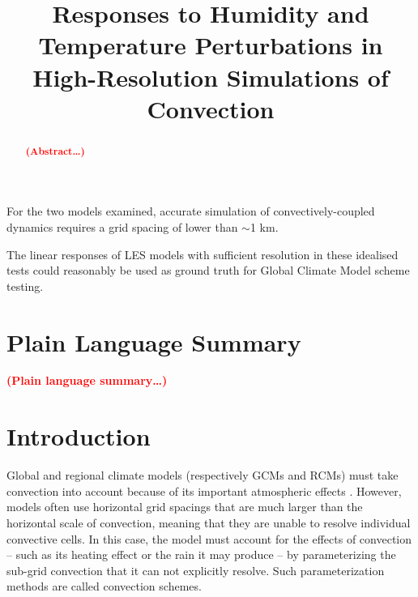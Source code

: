 \documentclass[draft]{agujournal2019}
\newcommand{\todo}[1]{\textcolor{red}{\textbf{(#1)}}}
\begin{document}
\title{Responses to Humidity and Temperature Perturbations in High-Resolution Simulations of Convection}




\begin{keypoints}
    \item For the two models examined, accurate simulation of convectively-coupled dynamics
    requires a grid spacing of lower than $\sim$1 km.
    \item The linear responses of LES models with sufficient resolution in these idealised tests could
    reasonably be used as ground truth for Global Climate Model scheme testing.
\end{keypoints}

\justifying
\begin{abstract}
\todo{Abstract\ldots}
\end{abstract}

\section*{Plain Language Summary}
\todo{Plain language summary\ldots}

\section{Introduction}

Global and regional climate models (respectively GCMs and RCMs) must take
convection into account because of its important atmospheric effects
\cite{Manabe_JAS_1964, Wallace_2006}. However, models often use horizontal grid
spacings that are much larger than the horizontal scale of convection, meaning
that they are unable to resolve individual convective cells. In this case, the
model must account for the effects of convection -- such as its heating effect
or the rain it may produce -- by parameterizing the sub-grid convection that it can
not explicitly resolve. Such parameterization methods are called convection
schemes. 
\end{document}
